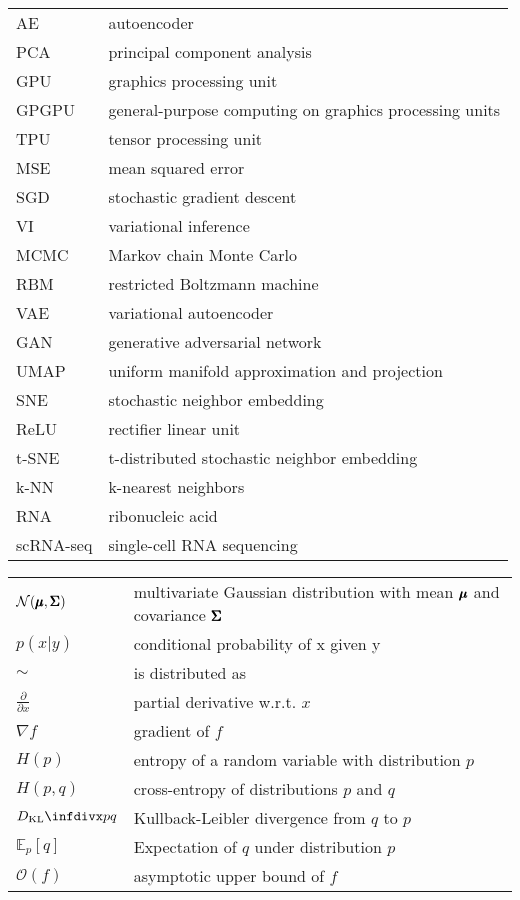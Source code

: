 \begin{tabular}[h]{@{} p{} p{} @{}}
AE        & autoencoder \\
PCA       & principal component analysis \\
GPU       & graphics processing unit \\
GPGPU     & general-purpose computing on graphics processing units \\
TPU       & tensor processing unit \\
MSE       & mean squared error \\
SGD       & stochastic gradient descent \\
VI        & variational inference \\
MCMC      & Markov chain Monte Carlo \\
RBM       & restricted Boltzmann machine \\
VAE       & variational autoencoder \\
GAN       & generative adversarial network \\
UMAP      & uniform manifold approximation and projection \\
SNE       & stochastic neighbor embedding \\
ReLU      & rectifier linear unit \\
t-SNE     & t-distributed stochastic neighbor embedding \\
k-NN      & k-nearest neighbors \\
RNA       & ribonucleic acid \\
scRNA-seq & single-cell RNA sequencing
\end{tabular}

\begin{tabular}[h]{@{} p{} p{} @{}}
$\mathcal{N}(\pmb{\mu}, \pmb{\Sigma})$  & multivariate Gaussian distribution with mean $\pmb{\mu}$ and covariance $\pmb{\Sigma}$ \\
$p(x \vert y)$                & conditional probability of x given y \\
$\sim$                        & is distributed as \\
$\frac{\partial}{\partial x}$ & partial derivative w.r.t. $x$ \\
$\nabla f$                    & gradient of $f$ \\
$H(p)$                        & entropy of a random variable with distribution $p$ \\
$H(p,q)$                      & cross-entropy of distributions $p$ and $q$ \\
$\dkl{p}{q}$                  & Kullback-Leibler divergence from $q$ to $p$ \\
$\mathbb{E}_{p}[q]$           & Expectation of $q$ under distribution $p$ \\
$\mathcal{O}(f)$              & asymptotic upper bound of $f$ \\
\end{tabular}
